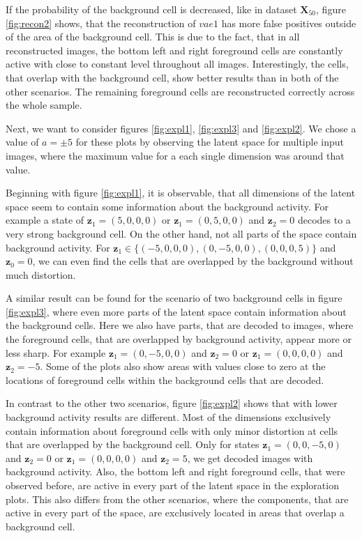 \documentclass[12pt]{report}
\theoremstyle{definition}
\begin{document}
If the probability of the background cell is decreased, like in dataset $\mathbf{X}_{50}$, figure \ref{fig:recon2} shows, that the reconstruction of $vae1$ has more false positives outside of the area of the background cell. This is due to the fact, that in all reconstructed images, the bottom left and right foreground cells are constantly active with close to constant level throughout all images. Interestingly, the cells, that overlap with the background cell, show better results than in both of the other scenarios. The remaining foreground cells are reconstructed correctly across the whole sample.

Next, we want to consider figures \ref{fig:expl1}, \ref{fig:expl3} and \ref{fig:expl2}. We chose a value of $a = \pm 5$ for these plots by observing the latent space for multiple input images, where the maximum value for a each single dimension was around that value.

Beginning with figure \ref{fig:expl1}, it is observable, that all dimensions of the latent space seem to contain some information about the background activity. For example a state of $\mathbf{z}_1 = (5, 0, 0, 0)$ or $\mathbf{z}_1 = (0, 5, 0, 0)$ and $\mathbf{z}_2 = 0$ decodes to a very strong background cell. On the other hand, not all parts of the space contain background activity. For $\mathbf{z}_1 \in \{(-5, 0, 0, 0), (0, -5, 0, 0), (0, 0, 0, 5)\}$ and $\mathbf{z}_0 = 0$, we can even find the cells that are overlapped by the background without much distortion.

A similar result can be found for the scenario of two background cells in figure \ref{fig:expl3}, where even more parts of the latent space contain information about the background cells. Here we also have parts, that are decoded to images, where the foreground cells, that are overlapped by background activity, appear more or less sharp. For example $\mathbf{z}_1 = (0, -5, 0, 0)$ and $\mathbf{z}_2=0$ or $\mathbf{z}_1 = (0, 0, 0, 0)$ and $\mathbf{z}_2 = -5$. Some of the plots also show areas with values close to zero at the locations of foreground cells within the background cells that are decoded.

In contrast to the other two scenarios, figure \ref{fig:expl2} shows that with lower background activity results are different. Most of the dimensions exclusively contain information about foreground cells with only minor distortion at cells that are overlapped by the background cell. Only for states $\mathbf{z}_1 = (0, 0, -5, 0)$ and $\mathbf{z}_2=0$ or $\mathbf{z}_1 = (0, 0, 0, 0)$ and $\mathbf{z}_2 = 5$, we get decoded images with background activity. Also, the bottom left and right foreground cells, that were observed before, are active in every part of the latent space in the exploration plots. This also differs from the other scenarios, where the components, that are active in every part of the space, are exclusively located in areas that overlap a background cell.
\end{document}
